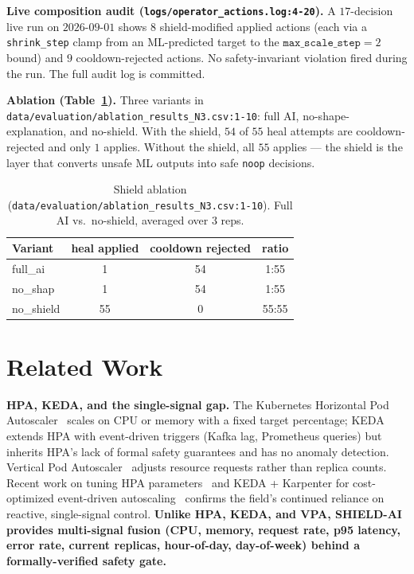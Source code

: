 \documentclass[conference,10pt]{IEEEtran}
\begin{document}
\textbf{Live composition audit (\texttt{logs/operator\_actions.log:4-20}).}
A $17$-decision live run on $2026$-$09$-$01$ shows $8$ shield-modified
applied actions (each via a \texttt{shrink\_step} clamp from an
ML-predicted target to the $\texttt{max\_scale\_step}=2$ bound) and
$9$ cooldown-rejected actions. No safety-invariant violation
fired during the run. The full audit log is committed.

\textbf{Ablation (Table~\ref{tab:ablation}).} Three variants in
\texttt{data/evaluation/ablation\_results\_N3.csv:1-10}: full AI,
no-shape-explanation, and no-shield. With the shield, $54$ of $55$
heal attempts are cooldown-rejected and only $1$ applies. Without
the shield, all $55$ applies --- the shield is the layer that converts
unsafe ML outputs into safe \texttt{noop} decisions.

\begin{table}[!t]
  \centering
  \caption{Shield ablation (\texttt{data/evaluation/ablation\_results\_N3.csv:1-10}). Full AI vs.\ no-shield, averaged over $3$ reps.}
  \label{tab:ablation}
  \begin{tabular}{lccc}
    \toprule
    \textbf{Variant} & \textbf{heal applied} & \textbf{cooldown rejected} & \textbf{ratio} \\
    \midrule
    full\_ai    & 1  & 54 & 1:55 \\
    no\_shap    & 1  & 54 & 1:55 \\
    no\_shield  & 55 & 0  & 55:55 \\
    \bottomrule
  \end{tabular}
\end{table}

\section{Related Work}
\label{sec:related}

\textbf{HPA, KEDA, and the single-signal gap.} The Kubernetes Horizontal
Pod Autoscaler~\cite{hpa_kep} scales on CPU or memory with a fixed
target percentage; KEDA~\cite{keda_doc} extends HPA with
event-driven triggers (Kafka lag, Prometheus queries) but inherits
HPA's lack of formal safety guarantees and has no anomaly detection.
Vertical Pod Autoscaler~\cite{vpa_kep} adjusts resource requests
rather than replica counts. Recent work on tuning HPA
parameters~\cite{k8s_hpa_tuning_2024} and KEDA + Karpenter for
cost-optimized event-driven autoscaling~\cite{karpenter_keda_2026}
confirms the field's continued reliance on reactive, single-signal
control. \textbf{Unlike HPA, KEDA, and VPA, SHIELD-AI provides
multi-signal fusion (CPU, memory, request rate, p95 latency, error
rate, current replicas, hour-of-day, day-of-week) behind a
formally-verified safety gate.}
\end{document}
